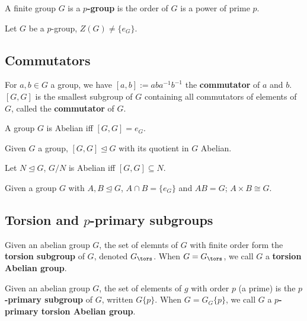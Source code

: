 \documentclass[../Year2.tex]{subfiles}
\begin{document}
\begin{definition}[$p$-group]
    A finite group $G$ is a \textbf{$p$-group} is the order of $G$ is a power of prime $p$.
\end{definition}

\begin{theorem}
    Let $G$ be a $p$-group, $Z(G)\neq \{e_G\}$.
\end{theorem}

\subsection{Commutators}

\begin{definition}[Commutator]
    For $a,b\in G$ a group, we have $[a,b]:=aba^{-1}b^{-1}$ the \textbf{commutator} of $a$ and $b$. $[G,G]$ is the smallest subgroup of $G$ containing all commutators of elements of $G$, called the \textbf{commutator} of $G$.
\end{definition}

\begin{remark}
    A group $G$ is Abelian iff $[G,G]=e_G$.
\end{remark}

\begin{theorem}
    Given $G$ a group, $[G,G]\unlhd G$ with its quotient in $G$ Abelian.
\end{theorem}

\begin{theorem}
    Let $N\unlhd G$, $G/N$ is Abelian iff $[G,G]\subseteq N$.
\end{theorem}

\begin{theorem}
    Given a group $G$ with $A,B\unlhd G$, $A\cap B=\{e_G\}$ and $AB=G$; $A\times B\cong G$.
\end{theorem}

\subsection{Torsion and $p$-primary subgroups}

\begin{definition}
    Given an abelian group $G$, the set of elemnts of $G$ with finite order form the \textbf{torsion subgroup} of $G$, denoted $G_{\tors}$. When $G=G_{\tors}$, we call $G$ a \textbf{torsion Abelian group}.
\end{definition}

\begin{definition}
    Given an abelian group $G$, the set of elements of $g$ with order $p$ (a prime) is the \textbf{$p$-primary subgroup} of $G$, written $G\{p\}$. When $G=G_G\{p\}$, we call $G$ a \textbf{$p$-primary torsion Abelian group}.
\end{definition}
\end{document}
